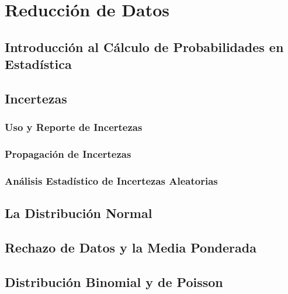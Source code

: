 \part{Reducción de Datos}

\chapter{Introducción al Cálculo de Probabilidades en Estadística}








\chapter{Incertezas}


\section{Uso y Reporte de Incertezas}


\section{Propagación de Incertezas}


\section{Análisis Estadístico de Incertezas Aleatorias}






\chapter{La Distribución Normal}










\chapter{Rechazo de Datos y la Media Ponderada}











\chapter{Distribución Binomial y de Poisson}










